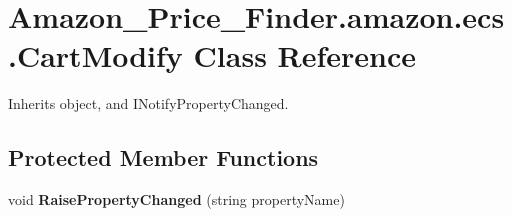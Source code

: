 \hypertarget{class_amazon___price___finder_1_1amazon_1_1ecs_1_1_cart_modify}{\section{Amazon\-\_\-\-Price\-\_\-\-Finder.\-amazon.\-ecs.\-Cart\-Modify Class Reference}
\label{class_amazon___price___finder_1_1amazon_1_1ecs_1_1_cart_modify}
}


 




Inherits object, and I\-Notify\-Property\-Changed.

\subsection*{Protected Member Functions}
\begin{DoxyCompactItemize}
\item 
\hypertarget{class_amazon___price___finder_1_1amazon_1_1ecs_1_1_cart_modify_a3b01ac2a49c26c0e2a60c32d33401fb7}{void {\bfseries Raise\-Property\-Changed} (string property\-Name)}\label{class_amazon___price___finder_1_1amazon_1_1ecs_1_1_cart_modify_a3b01ac2a49c26c0e2a60c32d33401fb7}

\end{DoxyCompactItemize}
